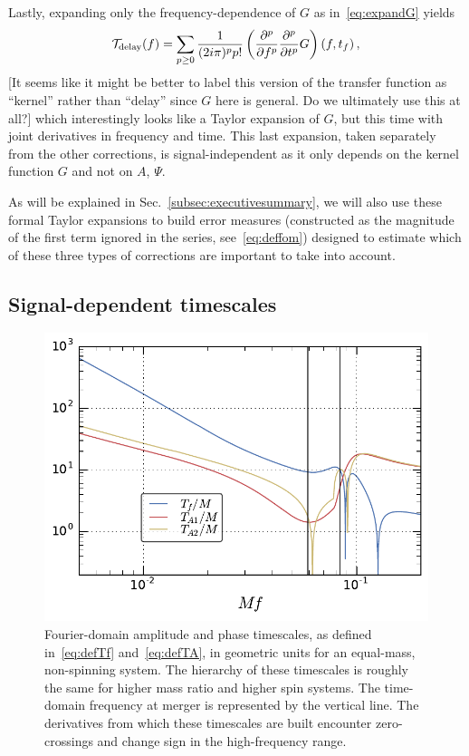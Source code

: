 \documentclass[aps,showpacs,twocolumn,
prd,superscriptaddress,nofootinbib]{revtex4-1}
\newcommand{\be}{\begin{equation}}
\newcommand{\ee}{\end{equation}}
\newcommand\calT{{\mathcal{T}}}
\newcommand{\tf}{t_{f}}
\newcommand{\jgb}[1]{{\color{DarkGreen} #1}}
\begin{document}
Lastly, expanding only the frequency-dependence of $G$ as in~\eqref{eq:expandG} yields
\be\label{eq:resulttaylordelay}
	\calT_{\rm delay}(f) = \sum\limits_{p\geq 0} \frac{1}{(2i\pi)^{p}p!} \left( \frac{\partial^{p} }{\partial f^{p}} \frac{\partial^{p} }{\partial t^{p}} G \right)(f,\tf) \,,
\ee
\jgb{[It seems like it might be better to label this version of the transfer function as ``kernel'' rather than ``delay'' since $G$ here is general. Do we ultimately use this at all?]}
which interestingly looks like a Taylor expansion of $G$, but this time with joint derivatives in frequency and time. This last expansion, taken separately from the other corrections, is signal-independent as it only depends on the kernel function $G$ and not on $A$, $\Psi$.

As will be explained in Sec.~\ref{subsec:executivesummary}, we will also use these formal Taylor expansions to build error measures (constructed as the magnitude of the first term ignored in the series, see~\eqref{eq:deffom}) designed to estimate which of these three types of corrections are important to take into account.


\subsection{Signal-dependent timescales}
\label{subsec:timescales}

\begin{figure}
  \centering
  \includegraphics[width=.98\linewidth]{plots/TfTA_py.pdf}
  \caption{Fourier-domain amplitude and phase timescales, as defined in~\eqref{eq:defTf} and~\eqref{eq:defTA}, in geometric units for an equal-mass, non-spinning system. The hierarchy of these timescales is roughly the same for higher mass ratio and higher spin systems. The time-domain frequency at merger is represented by the vertical line. The derivatives from which these timescales are built encounter zero-crossings and change sign in the high-frequency range.}
  \label{fig:TfTA}
\end{figure}
\end{document}
